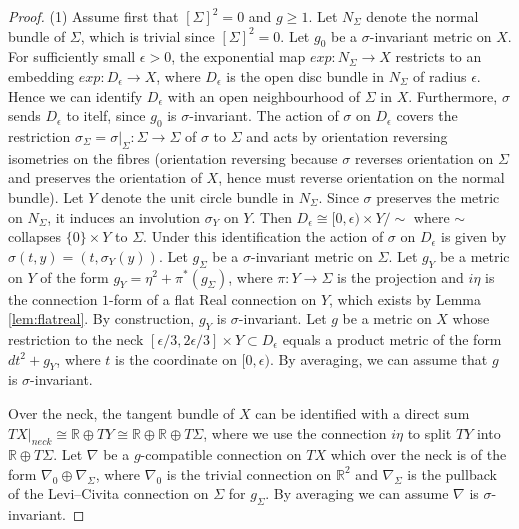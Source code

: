 \documentclass{amsart}
\theoremstyle{definition}
\theoremstyle{remark}
\numberwithin{equation}{section}
\begin{document}
\begin{proof}
(1) Assume first that $[\Sigma]^2 = 0$ and $g \ge 1$. Let $N_\Sigma$ denote the normal bundle of $\Sigma$, which is trivial since $[\Sigma]^2 = 0$. Let $g_0$ be a $\sigma$-invariant metric on $X$. For sufficiently small $\epsilon > 0$, the exponential map $exp : N_\Sigma \to X$ restricts to an embedding $exp : D_\epsilon \to X$, where $D_\epsilon$ is the open disc bundle in $N_\Sigma$ of radius $\epsilon$. Hence we can identify $D_\epsilon$ with an open neighbourhood of $\Sigma$ in $X$. Furthermore, $\sigma$ sends $D_\epsilon$ to itelf, since $g_0$ is $\sigma$-invariant. The action of $\sigma$ on $D_\epsilon$ covers the restriction $\sigma_\Sigma = \sigma|_{\Sigma} : \Sigma \to \Sigma$ of $\sigma$ to $\Sigma$ and acts by orientation reversing isometries on the fibres (orientation reversing because $\sigma$ reverses orientation on $\Sigma$ and preserves the orientation of $X$, hence must reverse orientation on the normal bundle). Let $Y$ denote the unit circle bundle in $N_\Sigma$. Since $\sigma$ preserves the metric on $N_\Sigma$, it induces an involution $\sigma_Y$ on $Y$. Then $D_\epsilon \cong [0,\epsilon) \times Y/\! \!\sim$ where $\sim$ collapses $\{0\} \times Y$ to $\Sigma$. Under this identification the action of $\sigma$ on $D_\epsilon$ is given by $\sigma(t,y) = (t , \sigma_Y(y))$. Let $g_\Sigma$ be a $\sigma$-invariant metric on $\Sigma$. Let $g_Y$ be a metric on $Y$ of the form $g_Y = \eta^2 + \pi^*(g_\Sigma)$, where $\pi : Y \to \Sigma$ is the projection and $i\eta$ is the connection $1$-form of a flat Real connection on $Y$, which exists by Lemma \ref{lem:flatreal}. By construction, $g_Y$ is $\sigma$-invariant. Let $g$ be a metric on $X$ whose restriction to the neck $[\epsilon/3 , 2\epsilon/3] \times Y \subset D_\epsilon$ equals a product metric of the form $dt^2 + g_Y$, where $t$ is the coordinate on $[0 , \epsilon)$. By averaging, we can assume that $g$ is $\sigma$-invariant. 

Over the neck, the tangent bundle of $X$ can be identified with a direct sum $TX|_{neck} \cong \mathbb{R} \oplus TY \cong \mathbb{R} \oplus \mathbb{R} \oplus T\Sigma$, where we use the connection $i\eta$ to split $TY$ into $\mathbb{R} \oplus T\Sigma$. Let $\nabla$ be a $g$-compatible connection on $TX$ which over the neck is of the form $\nabla_0 \oplus \nabla_\Sigma$, where $\nabla_0$ is the trivial connection on $\mathbb{R}^2$ and $\nabla_\Sigma$ is the pullback of the Levi--Civita connection on $\Sigma$ for $g_\Sigma$. By averaging we can assume $\nabla$ is $\sigma$-invariant.


\end{proof}
\end{document}
